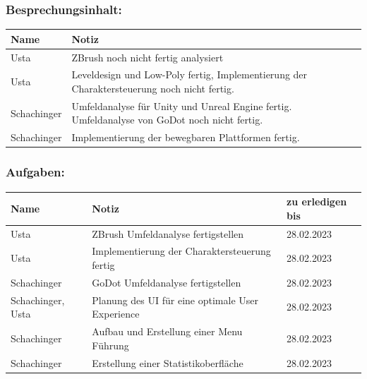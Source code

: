 \subsubsection*{Besprechungsinhalt:}
\begin{tabular}{|m{}|m{}|}
\hline
Name & Notiz \\
\hline
Usta & ZBrush noch nicht fertig analysiert \\
\hline
Usta & Leveldesign und Low-Poly fertig, Implementierung der Charaktersteuerung noch nicht fertig. \\
\hline
Schachinger & Umfeldanalyse für Unity und Unreal Engine fertig. Umfeldanalyse von GoDot noch nicht fertig. \\
\hline
Schachinger & Implementierung der bewegbaren Plattformen fertig. \\
\hline
\end{tabular}

\subsubsection*{Aufgaben:}
\begin{tabular}{|m{}|m{}|m{}|}
\hline
Name & Notiz & zu erledigen bis \\
\hline
Usta & ZBrush Umfeldanalyse fertigstellen & 28.02.2023 \\
\hline
Usta & Implementierung der Charaktersteuerung fertig & 28.02.2023 \\
\hline
Schachinger & GoDot Umfeldanalyse fertigstellen & 28.02.2023 \\
\hline
Schachinger, Usta & Planung des UI für eine optimale User Experience & 28.02.2023 \\
\hline
Schachinger & Aufbau und Erstellung einer Menu Führung & 28.02.2023 \\
\hline
Schachinger & Erstellung einer Statistikoberfläche & 28.02.2023 \\
\hline
\end{tabular}


\pagebreak

